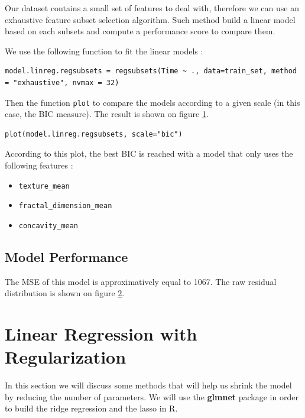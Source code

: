 \documentclass[]{report}
\begin{document}
Our dataset contains a small set of features to deal with, therefore we can use an exhaustive feature subset selection algorithm. Such method build a linear model based on each subsets and compute a performance score to compare them. 

We use the following function to fit the linear models :
\begin{lstlisting}
model.linreg.regsubsets = regsubsets(Time ~ ., data=train_set, method = "exhaustive", nvmax = 32)
\end{lstlisting}

Then the function \texttt{plot} to compare the models according to a given scale (in this case, the BIC measure). The result is shown on figure \ref{fig:subset_bic}.
\begin{lstlisting}
plot(model.linreg.regsubsets, scale="bic")	
\end{lstlisting}

\begin{figure}[!h]
	\centering
	
	\caption{}
	\label{fig:subset_bic}
\end{figure}

According to this plot, the best BIC is reached with a model that only uses the following features : 
\begin{itemize}
	\item \texttt{texture\_mean}
	\item \texttt{fractal\_dimension\_mean}
	\item \texttt{concavity\_mean}
\end{itemize}

\subsection{Model Performance}
The MSE of this model is approximatively equal to 1067. The raw residual distribution is shown on figure \ref{fig:subset_hist}. 

\begin{figure}[!h]
	\centering
	
	\caption{}
	\label{fig:subset_hist}
\end{figure}

\section{Linear Regression with Regularization}
In this section we will discuss some methods that will help us shrink the model by reducing the number of parameters.
We will use the \textbf{glmnet} package in order to build the ridge regression and the lasso in R.
\end{document}
